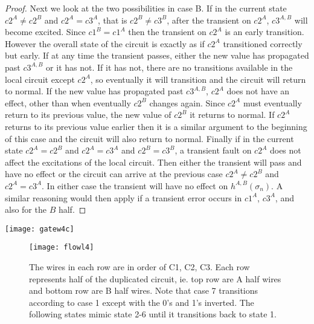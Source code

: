 \documentclass{article}
\begin{document}
\begin{proof}
Next we look at the two possibilities in case B.  If in the current state $c2^A\neq c2^B$ and $c2^A= c3^A$, that is $c2^B\neq c3^B$, after the transient on $c2^A$, $c3^{A,B}$ will become excited.  Since $c1^B=c1^A$ then the transient on $c2^A$ is an early transition.  However the overall state of the circuit is exactly as if $c2^A$ transitioned correctly but early.  If at any time the transient passes, either the new value has propagated past $c3^{A,B}$ or it has not.  If it has not, there are no transitions available in the local circuit except $c2^A$, so eventually it will transition and the circuit will return to normal.  If the new value has propagated past $c3^{A,B}$, $c2^A$ does not have an effect, other than when eventually $c2^B$ changes again. Since $c2^A$ must eventually return to its previous value, the new value of $c2^B$ it returns to normal.  If $c2^A$ returns to its previous value earlier then it is a similar argument to the beginning of this case and the circuit will also return to normal.
Finally if in the current state $c2^A=c2^B$ and $c2^A=c3^A$ and $c2^B=c3^B$, a transient fault on $c2^A$ does not affect the excitations of the local circuit.  Then either the transient will pass and have no effect or the circuit can arrive at the previous case $c2^A\neq c2^B$ and $c2^A= c3^A$.  In either case the transient will have no effect on $h^{A,B}(\sigma_n)$.
A similar reasoning would then apply if a transient error occurs in $c1^A$, $c3^A$, and also for the $B$ half.  
\end{proof}

\texttt{[image: gatew4c]}\newline
\begin{figure}
  \centering
    \texttt{[image: flowl4]}
  \caption{The wires in each row are in order of C1, C2, C3.  Each row represents half of the duplicated circuit, ie. top row are A half wires and bottom row are B half wires.  Note that case 7 transitions according to case 1 except with the 0's and 1's inverted.  The following states mimic state 2-6 until it transitions back to state 1.}
\end{figure}
\end{document}
